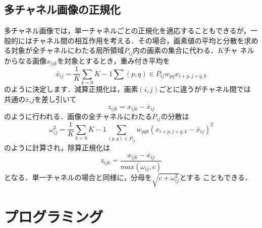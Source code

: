 \documentclass[a4paper,10pt]{jsarticle}
\begin{document}
\subsection{多チャネル画像の正規化}
多チャネル画像では，単一チャネルごとの正規化を適応することもできるが，一
般的にはチャネル間の相互作用を考える．その場合，画素値の平均と分散を求め
る対象が全チャネルにわたる局所領域$P_{ij}$内の画素の集合に代わる．$K$チャ
ネルからなる画像$x_{ijk}$を対象とするとき，重み付き平均を
\begin{equation}
 \bar{x}_{ij}=\frac{1}{K}\sum_{k=0}{K-1}\sum{(p,q)\in{P_{ij}}}{} w_{pq}x_{i+p,j+q,k}
\end{equation}
のように決定します．減算正規化は，画素$(i,j)$ごとに違うがチャネル間では
共通の$\bar{x}_ij$を差し引いて
\begin{equation}
 z_{ijk}=x_{ijk}-\bar{x}_{ij}
\end{equation}
のように行われる．画像の全チャネルにわたる$P_{ij}$の分散は
\begin{equation}
  \omega^2_{ij}=\frac{1}{K}\sum_{k=0}{K-1}\sum_{(p,q)\in{P_{ij}}}^{} w_{pqk}(x_{i+p,j+q,k}-\bar{x}_{ij})^2
\end{equation}
のように計算され，除算正規化は
\begin{equation}
  z_{ijk}=\frac{x_{ijk}-\bar{x}_{ij}}{max(\omega_{ij},c)}
\end{equation}
となる．単一チャネルの場合と同様に，分母を$\sqrt{c+\omega^2_{ij}}$とする
こともできる．


\section{プログラミング}
\end{document}

